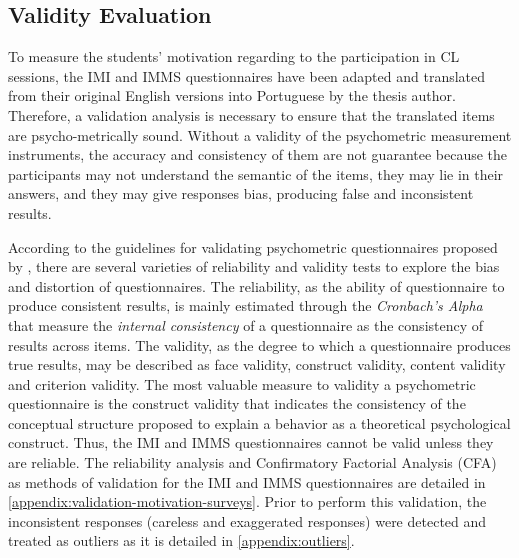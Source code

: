 \subsection{Validity Evaluation}
\label{subsec:validity-evaluation}

To measure the students' motivation regarding to the participation in CL sessions, the IMI and IMMS questionnaires have been adapted and translated from their original English versions into Portuguese by the thesis author.
Therefore, a validation analysis is necessary to ensure that the translated items are psycho-metrically sound.
Without a validity of the psychometric measurement instruments, the accuracy and consistency of them are not guarantee because the participants may not understand the semantic of the items, they may lie in their answers, and they may give responses bias, producing false and inconsistent results.

According to the guidelines for validating psychometric questionnaires proposed by , there are several varieties of reliability and validity tests to explore the bias and distortion of questionnaires.
The reliability, as the ability of questionnaire to produce consistent results, is mainly estimated through the \emph{Cronbach's Alpha} that measure the \emph{internal consistency} of a questionnaire as the consistency of results across items.
The validity, as the degree to which a questionnaire produces true results, may be described as face validity, construct validity, content validity and criterion validity.
The most valuable measure to validity a psychometric questionnaire is the construct validity that indicates the consistency of the conceptual structure proposed to explain a behavior as a theoretical psychological construct.
Thus, the IMI and IMMS questionnaires cannot be valid unless they are reliable.
The reliability analysis and Confirmatory Factorial Analysis (CFA) as methods of validation for the IMI and IMMS questionnaires are detailed in \autoref{appendix:validation-motivation-surveys}.
Prior to perform this validation, the inconsistent responses (careless and exaggerated responses) were detected and treated as outliers as it is detailed in \autoref{appendix:outliers}.

